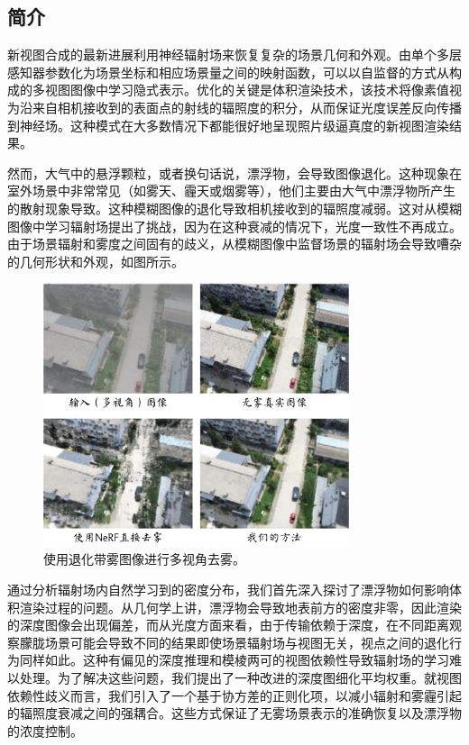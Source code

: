 \subsection{简介}
新视图合成的最新进展利用神经辐射场来恢复复杂的场景几何和外观。由单个多层感知器参数化为场景坐标和相应场景量之间的映射函数，可以以自监督的方式从构成的多视图图像中学习隐式表示。优化的关键是体积渲染技术，该技术将像素值视为沿来自相机接收到的表面点的射线的辐照度的积分，从而保证光度误差反向传播到神经场。这种模式在大多数情况下都能很好地呈现照片级逼真度的新视图渲染结果。

然而，大气中的悬浮颗粒，或者换句话说，漂浮物，会导致图像退化。这种现象在室外场景中非常常见（如雾天、霾天或烟雾等），他们主要由大气中漂浮物所产生的散射现象导致。这种模糊图像的退化导致相机接收到的辐照度减弱。这对从模糊图像中学习辐射场提出了挑战，因为在这种衰减的情况下，光度一致性不再成立。由于场景辐射和雾度之间固有的歧义，从模糊图像中监督场景的辐射场会导致嘈杂的几何形状和外观，如图所示。

\begin{figure}[ht]
    \centering
    \includegraphics[width=0.8\textwidth]{undergraduate-thesis/images/dehazing-nerf/teaser.pdf}
    \caption{使用退化带雾图像进行多视角去雾。}
    \label{fig:dehazing-nerf teaser}
\end{figure}

通过分析辐射场内自然学习到的密度分布，我们首先深入探讨了漂浮物如何影响体积渲染过程的问题。从几何学上讲，漂浮物会导致地表前方的密度非零，因此渲染的深度图像会出现偏差，而从光度方面来看，由于传输依赖于深度，在不同距离观察朦胧场景可能会导致不同的结果即使场景辐射场与视图无关，视点之间的退化行为同样如此。这种有偏见的深度推理和模棱两可的视图依赖性导致辐射场的学习难以处理。为了解决这些问题，我们提出了一种改进的深度图细化平均权重。就视图依赖性歧义而言，我们引入了一个基于协方差的正则化项，以减小辐射和雾霾引起的辐照度衰减之间的强耦合。这些方式保证了无雾场景表示的准确恢复以及漂浮物的浓度控制。

